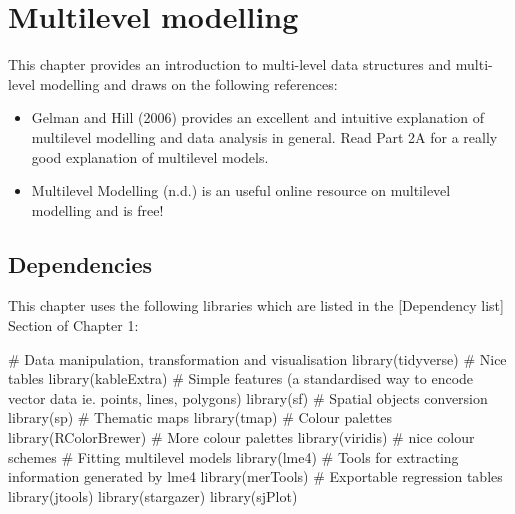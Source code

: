 \documentclass[
  letterpaper,
  krantz2]{style/krantz}
\newenvironment{Shaded}{\begin{snugshade}}{\end{snugshade}}
\newcommand{\CommentTok}[1]{\textcolor[rgb]{0.37,0.37,0.37}{#1}}
\newcommand{\FunctionTok}[1]{\textcolor[rgb]{0.28,0.35,0.67}{#1}}
\newcommand{\NormalTok}[1]{\textcolor[rgb]{0.00,0.23,0.31}{#1}}
\providecommand{\tightlist}{%
  \setlength{\itemsep}{0pt}\setlength{\parskip}{0pt}}\usepackage{longtable,booktabs,array}
\begin{document}
\hypertarget{multilevel-modelling}{%
\chapter{Multilevel modelling}\label{multilevel-modelling}}

This chapter provides an introduction to multi-level data structures and
multi-level modelling and draws on the following references:

\begin{itemize}
\tightlist
\item
  Gelman and Hill (2006) provides an excellent and intuitive explanation
  of multilevel modelling and data analysis in general. Read Part 2A for
  a really good explanation of multilevel models.
\item
  Multilevel Modelling (n.d.) is an useful online resource on multilevel
  modelling and is free!
\end{itemize}

\hypertarget{dependencies-4}{%
\section{Dependencies}\label{dependencies-4}}

This chapter uses the following libraries which are listed in the
{[}Dependency list{]} Section of Chapter 1:

\begin{Shaded}
\begin{Highlighting}[]
\CommentTok{\# Data manipulation, transformation and visualisation}
\FunctionTok{library}\NormalTok{(tidyverse)}
\CommentTok{\# Nice tables}
\FunctionTok{library}\NormalTok{(kableExtra)}
\CommentTok{\# Simple features (a standardised way to encode vector data ie. points, lines, polygons)}
\FunctionTok{library}\NormalTok{(sf) }
\CommentTok{\# Spatial objects conversion}
\FunctionTok{library}\NormalTok{(sp) }
\CommentTok{\# Thematic maps}
\FunctionTok{library}\NormalTok{(tmap) }
\CommentTok{\# Colour palettes}
\FunctionTok{library}\NormalTok{(RColorBrewer) }
\CommentTok{\# More colour palettes}
\FunctionTok{library}\NormalTok{(viridis) }\CommentTok{\# nice colour schemes}
\CommentTok{\# Fitting multilevel models}
\FunctionTok{library}\NormalTok{(lme4)}
\CommentTok{\# Tools for extracting information generated by lme4}
\FunctionTok{library}\NormalTok{(merTools)}
\CommentTok{\# Exportable regression tables}
\FunctionTok{library}\NormalTok{(jtools)}
\FunctionTok{library}\NormalTok{(stargazer)}
\FunctionTok{library}\NormalTok{(sjPlot)}
\end{Highlighting}
\end{Shaded}
\end{document}
